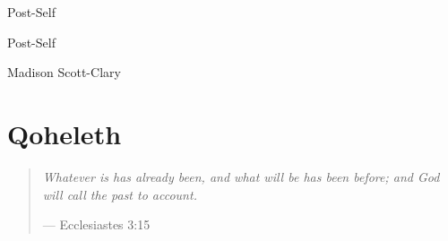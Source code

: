 \documentclass[10pt]{memoir}
\begin{document}
  \nopartblankpage
  \makeatletter
  \renewcommand*{\beforepartskip}{\null\vfill\thispagestyle{empty}}
  \renewcommand*{\afterpartskip}{\par\vskip1cm%
  \@afterindentfalse\@afterheading}
  \makeatother
  \setcounter{part}{0}

  \frontmatter

  \thispagestyle{empty}
  \null
  \vfill
  \begin{flushright}
    \DisplayFont Post-Self
  \end{flushright}
  \vfill
  \cleardoublepage

  \pagestyle{plain}

  \doublespacing

  \begin{flushright}
    \null
    \vfill
    {\Huge\DisplayFont Post-Self}

    \vfill

    {\Large\DisplayFont Madison Scott-Clary}
  \end{flushright}
  \thispagestyle{empty}

  \newpage

  

  \setcounter{tocdepth}{-1}
  \tableofcontents*
  \newpage
  \null
  \cleardoublepage

  \mainmatter

  \pagestyle{ourbook}

  \cleardoublepage

  \part*{Qoheleth}
  \null
  \thispagestyle{empty}
  \vfill
  \begin{quote}
    \emph{Whatever is has already been, and what will be has been \mbox{before;} and God will call the past to account.}

    --- Ecclesiastes 3:15
  \end{quote}
  \vfill
  
\end{document}
